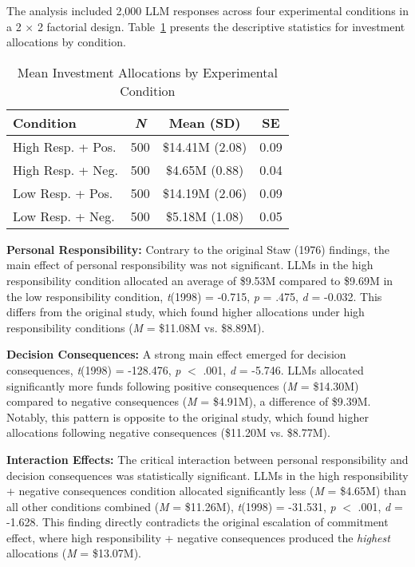 \documentclass[letterpaper]{article} %
\begin{document}

The analysis included 2,000 LLM responses across four experimental conditions in a 2 $\times$ 2 factorial design. Table~\ref{tab:study-1-table} presents the descriptive statistics for investment allocations by condition.

\begin{table}[h]
\centering
\small %
\caption{Mean Investment Allocations by Experimental Condition}
\label{tab:study-1-table}
\begin{tabular}{lccc}
\hline
Condition & \textit{N} & Mean (SD) & SE \\
\hline
High Resp. + Pos. & 500 & \$14.41M (2.08) & 0.09 \\
High Resp. + Neg. & 500 & \$4.65M (0.88) & 0.04 \\
Low Resp. + Pos. & 500 & \$14.19M (2.06) & 0.09 \\
Low Resp. + Neg. & 500 & \$5.18M (1.08) & 0.05 \\
\hline
\end{tabular}
\end{table}

\textbf{Personal Responsibility:} Contrary to the original Staw (1976) findings, the main effect of personal responsibility was not significant. LLMs in the high responsibility condition allocated an average of \$9.53M compared to \$9.69M in the low responsibility condition, \textit{t}(1998) = -0.715, \textit{p} = .475, \textit{d} = -0.032. This differs from the original study, which found higher allocations under high responsibility conditions (\textit{M} = \$11.08M vs. \$8.89M).

\textbf{Decision Consequences:} A strong main effect emerged for decision consequences, \textit{t}(1998) = -128.476, \textit{p} $<$ .001, \textit{d} = -5.746. LLMs allocated significantly more funds following positive consequences (\textit{M} = \$14.30M) compared to negative consequences (\textit{M} = \$4.91M), a difference of \$9.39M. Notably, this pattern is opposite to the original study, which found higher allocations following negative consequences (\$11.20M vs. \$8.77M).

\textbf{Interaction Effects:} The critical interaction between personal responsibility and decision consequences was statistically significant. LLMs in the high responsibility + negative consequences condition allocated significantly less (\textit{M} = \$4.65M) than all other conditions combined (\textit{M} = \$11.26M), \textit{t}(1998) = -31.531, \textit{p} $<$ .001, \textit{d} = -1.628. This finding directly contradicts the original escalation of commitment effect, where high responsibility + negative consequences produced the \textit{highest} allocations (\textit{M} = \$13.07M).
\end{document}
